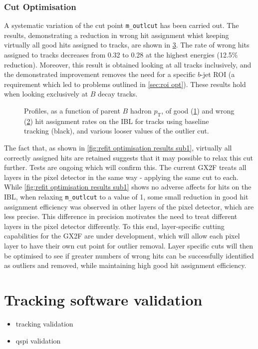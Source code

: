 \subsubsection{Cut Optimisation}\label{sec:cut opt}
A systematic variation of the cut point \texttt{m\_outlcut} has been carried out. The results, demonstrating a reduction in wrong hit assignment whist keeping virtually all good hits assigned to tracks, are shown in \cref{fig:outlier cut scan}. The rate of wrong hits assigned to tracks decreases from 0.32 to 0.28 at the highest energies (12.5\% reduction). Moreover, this result is obtained looking at all tracks inclusively, and the demonstrated improvement removes the need for a specific $b$-jet ROI (a requirement which led to problems outlined in \cref{sec:roi opt}). These results hold when looking exclusively at $B$ decay tracks.
%
\begin{figure}[!htbp]
    \centering
    \begin{subfigure}{.5\textwidth}
      \centering
      \caption{}
      \label{fig:outlier cut scan sub1}
    \end{subfigure}%
    \begin{subfigure}{.5\textwidth}
      \centering
      \caption{}
      \label{fig:outlier cut scan sub2}
    \end{subfigure}
    \caption{Profiles, as a function of parent $B$ hadron $p_{\text{T}}$, of good (\cref{fig:outlier cut scan sub1}) and wrong (\cref{fig:outlier cut scan sub2}) hit assignment rates on the IBL for tracks using baseline tracking (black), and various looser values of the outlier cut.}
    \label{fig:outlier cut scan}
\end{figure}
%
The fact that, as shown in \cref{fig:refit optimisation results sub1}, virtually all correctly assigned hits are retained suggests that it may possible to relax this cut further. Tests are ongoing which will confirm this. The current GX2F treats all layers in the pixel detector in the same way - applying the same cut to each. While \cref{fig:refit optimisation results sub1} shows no adverse affects for hits on the IBL, when relaxing \texttt{m\_outlcut} to a value of 1, some small reduction in good hit assignment efficiency was observed in other layers of the pixel detector, which are less precise. This difference in precision motivates the need to treat different layers in the pixel detector differently. To this end, layer-specific cutting capabilities for the GX2F are under development, which will allow each pixel layer to have their own cut point for outlier removal. Layer specific cuts will then be optimised to see if greater numbers of wrong hits can be successfully identified as outliers and removed, while maintaining high good hit assignment efficiency.


\section{Tracking software validation}\label{sec:r22-validation}

\begin{itemize}
  \item tracking validation
  \item qspi validation
\end{itemize}
